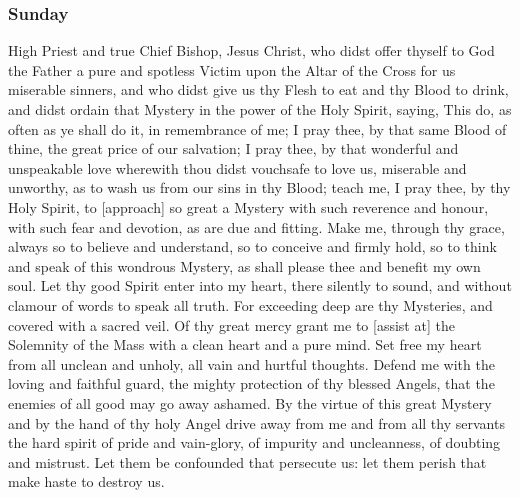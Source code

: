 \subsubsection{Sunday}
 High Priest and true Chief Bishop, Jesus Christ, who didst offer thyself to God the Father a pure and spotless Victim upon the Altar of the Cross for us miserable sinners, and who didst give us thy Flesh to eat and thy Blood to drink, and didst ordain that Mystery in the power of the Holy Spirit, saying, This do, as often as ye shall do it, in remembrance of me; I pray thee, by that same Blood of thine, the great price of our salvation; I pray thee, by that wonderful and unspeakable love wherewith thou didst vouchsafe to love us, miserable and unworthy, as to wash us from our sins in thy Blood;\textsuperscript{} teach me, I pray thee, by thy Holy Spirit, to [approach] so great a Mystery with such reverence and honour, with such fear and devotion, as are due and fitting. Make me, through thy grace, always so to believe and understand, so to conceive and firmly hold, so to think and speak of this wondrous Mystery, as shall please thee and benefit my own soul. Let thy good Spirit enter into my heart, there silently to sound, and without clamour of words to speak all truth. For exceeding deep are thy Mysteries, and covered with a sacred veil. Of thy great mercy grant me to [assist at] the Solemnity of the Mass with a clean heart and a pure mind. Set free my heart from all unclean and unholy, all vain and hurtful thoughts. Defend me with the loving and faithful guard, the mighty protection of thy blessed Angels, that the enemies of all good may go away ashamed. By the virtue of this great Mystery and by the hand of thy holy Angel drive away from me and from all thy servants the hard spirit of pride and vain-glory, of impurity and uncleanness, of doubting and mistrust. Let them be confounded that persecute us: let them perish that make haste to destroy us. 
